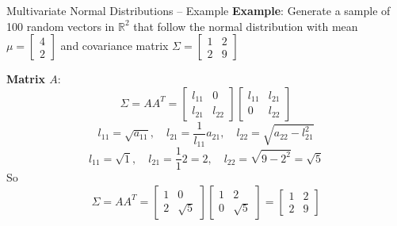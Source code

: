 \documentclass[8pt]{beamer}
\begin{document}
\begin{frame}{Multivariate Normal Distributions -- Example}
\textbf{Example}: Generate a sample of 100 random vectors in $\mathbb{R}^2$ that follow the normal distribution with mean 
$\mu=\left[\begin{array}{l} 4 \\ 2\end{array}\right]$ and covariance matrix $\Sigma=\left[\begin{array}{ll} 1 & 2\\ 2 & 9\end{array}\right]$

\vspace{2mm}

\textbf{Matrix $A$}:
\begin{equation*}
\Sigma = AA^T = \left[\begin{array}{ll} l_{11} & 0\\ l_{21} & l_{22}\end{array}\right]\left[\begin{array}{ll} l_{11} & l_{21}\\ 0 & l_{22}\end{array}\right]
\end{equation*}
\begin{equation*}
l_{11} = \sqrt{a_{11}}, \quad l_{21} = \frac{1}{l_{11}} a_{21}, \quad l_{22} = \sqrt{a_{22}-l_{21}^{2}}
\end{equation*}
\begin{equation*}
l_{11} = \sqrt{1}, \quad l_{21} = \frac{1}{1}2 = 2, \quad l_{22} = \sqrt{9 - 2^2} = \sqrt{5}
\end{equation*}
So
\begin{equation*}
\Sigma = AA^T = \left[\begin{array}{ll} 1 & 0\\ 2 & \sqrt{5} \end{array}\right]\left[\begin{array}{ll} 1 & 2\\ 0 & \sqrt{5}\end{array}\right] = \left[\begin{array}{ll} 1 & 2\\ 2 & 9\end{array}\right]
\end{equation*}
\end{frame}
\end{document}
